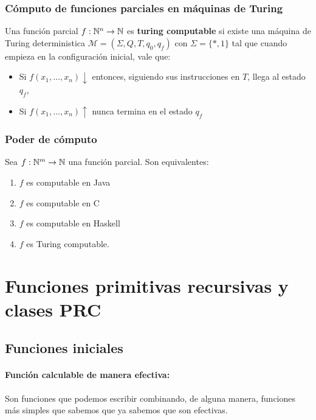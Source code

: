 	
	\subsubsection{Cómputo de funciones parciales en máquinas de Turing}
	Una función parcial $f:\mathbb{N}^n\to\mathbb{N}$ es \textbf{turing computable} si existe una máquina de Turing deterministica $\mathcal{M}=(\Sigma, Q, T, q_0, q_f)$ con $\Sigma=\{*,1\}$ tal que cuando empieza en la configuración inicial, vale que:
	
	\begin{itemize}
		\item Si $f(x_1,\dots, x_n)\downarrow$ entonces, siguiendo sus instrucciones en $T$, llega al estado $q_f$,
		\item  Si $f(x_1,\dots, x_n)\uparrow$ nunca termina en el estado $q_f$
	\end{itemize}
	

	
	\subsubsection{Poder de  cómputo}
	
	Sea $f:\mathbb{N}^m\to\mathbb{N}$ una función parcial. Son equivalentes:
	\begin{enumerate}
		\item $f$ es computable en Java
		\item $f$ es computable en C
		\item $f$ es computable en Haskell
		\item $f$ es Turing computable.
	\end{enumerate}
	
	\section{Funciones primitivas recursivas y clases PRC}
	\subsection{Funciones iniciales}
	\paragraph{Función calculable de manera efectiva:} Son funciones que podemos escribir combinando, de alguna manera, funciones más simples que sabemos que ya sabemos que son efectivas.
	
